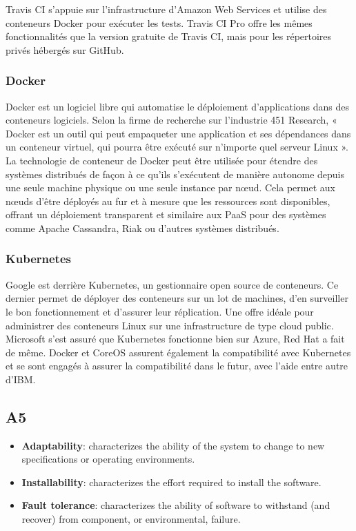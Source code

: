     Travis CI s'appuie sur l'infrastructure d'Amazon Web Services et utilise des conteneurs Docker pour exécuter les tests. Travis CI Pro offre les mêmes fonctionnalités que la version gratuite de Travis CI, mais pour les répertoires privés hébergés sur GitHub.

    \subsubsection*{Docker}
    Docker est un logiciel libre qui automatise le déploiement d'applications dans des conteneurs logiciels. Selon la firme de recherche sur l'industrie 451 Research, « Docker est un outil qui peut empaqueter une application et ses dépendances dans un conteneur virtuel, qui pourra être exécuté sur n'importe quel serveur Linux ».\\

    La technologie de conteneur de Docker peut être utilisée pour étendre des systèmes distribués de façon à ce qu'ils s'exécutent de manière autonome depuis une seule machine physique ou une seule instance par nœud. Cela permet aux nœuds d'être déployés au fur et à mesure que les ressources sont disponibles, offrant un déploiement transparent et similaire aux PaaS pour des systèmes comme Apache Cassandra, Riak ou d'autres systèmes distribués.

    \subsubsection*{Kubernetes}
    Google est derrière Kubernetes, un gestionnaire open source de conteneurs. Ce dernier permet de déployer des conteneurs sur un lot de machines, d’en surveiller le bon fonctionnement et d’assurer leur réplication. Une offre idéale pour administrer des conteneurs Linux sur une infrastructure de type cloud public. Microsoft s'est assuré que Kubernetes fonctionne bien sur Azure, Red Hat a fait de même. Docker et CoreOS assurent également la compatibilité avec Kubernetes et se sont engagés à assurer la compatibilité dans le futur, avec l'aide entre autre d'IBM.

\subsection*{A5}
    \begin{itemize}
        \item \textbf{Adaptability}: characterizes the ability of the system to change to new specifications or operating environments.
        \item \textbf{Installability}: characterizes the effort required to install the software.
        \item \textbf{Fault tolerance}: characterizes the ability of software to withstand (and recover) from component, or environmental, failure.
    \end{itemize}

